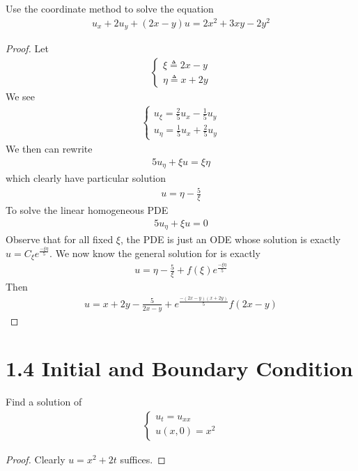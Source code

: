 \documentclass{report}
\begin{document}
\begin{question}{}{}
Use the coordinate method to solve the equation 
\begin{align*}
u_x+2u_y+(2x-y)u=2x^2 + 3xy -2y^2
\end{align*}
\end{question}
\begin{proof}
Let 
\begin{align*}
\begin{cases}
  \xi\triangleq 2x-y \\
  \eta  \triangleq x+2y 
\end{cases}
\end{align*}
We see 
\begin{align*}
\begin{cases}
  u_{\xi}=\frac{2}{5}u_x -\frac{1}{5}u_y\\
  u_{\eta }= \frac{1}{5}u_x + \frac{2}{5}u_y
\end{cases}
\end{align*}
We then can rewrite 
\begin{align}
\label{5ua}
5 u_\eta + \xi u= \xi \eta 
\end{align}
which clearly have particular solution 
\begin{align*}
u=\eta - \frac{5}{\xi} 
\end{align*}
To solve the linear homogeneous PDE 
\begin{align*}
5u_{\eta}+ \xi u =0
\end{align*}
Observe that for all fixed $\xi$, the PDE is just an ODE whose solution is exactly $u=C_\xi e^{\frac{-\xi \eta }{5}}$. We now know the general solution for  is exactly 
\begin{align*}
u=\eta - \frac{5}{\xi} +f(\xi) e^{\frac{-\xi \eta }{5}} 
\end{align*}
Then 
\begin{align*}
u= x+2y - \frac{5}{2x-y}+ e^{\frac{-(2x-y)(x+2y)}{5}} f(2x-y)
\end{align*}

\end{proof}
\section{1.4 Initial and Boundary Condition}
\begin{question}{}{}
Find a solution of 
\begin{align*}
\begin{cases}
  u_t=u_{xx}\\
  u(x,0)=x^2
\end{cases}
\end{align*}
\end{question}
\begin{proof}
Clearly $u=x^2+2t$ suffices.
\end{proof}
\end{document}

